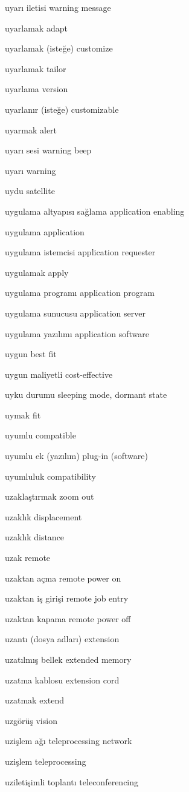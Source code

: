 \documentclass[12pt,fleqn]{article}\usepackage{../../common}
\begin{document}
uyarı iletisi warning message

uyarlamak adapt

uyarlamak (isteğe) customize

uyarlamak tailor

uyarlama version

uyarlanır (isteğe) customizable

uyarmak alert

uyarı sesi warning beep

uyarı warning

uydu satellite

uygulama altyapısı sağlama application enabling

uygulama application

uygulama istemcisi application requester

uygulamak apply

uygulama programı application program

uygulama sunucusu application server

uygulama yazılımı application software

uygun best fit

uygun maliyetli cost-effective

uyku durumu sleeping mode, dormant state

uymak fit

uyumlu compatible

uyumlu ek (yazılım) plug-in (software)

uyumluluk compatibility

uzaklaştırmak zoom out

uzaklık displacement

uzaklık distance

uzak remote

uzaktan açma remote power on

uzaktan iş girişi remote job entry

uzaktan kapama remote power off

uzantı (dosya adları) extension

uzatılmış bellek extended memory

uzatma kablosu extension cord

uzatmak extend

uzgörüş vision

uzişlem ağı teleprocessing network

uzişlem teleprocessing

uziletişimli toplantı teleconferencing
\end{document}
